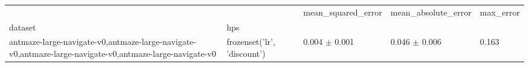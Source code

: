 \begin{tabular}{lllll}
\toprule
 &  & mean_squared_error & mean_absolute_error & max_error \\
dataset & hps &  &  &  \\
\midrule
antmaze-large-navigate-v0,antmaze-large-navigate-v0,antmaze-large-navigate-v0,antmaze-large-navigate-v0 & frozenset({'lr', 'discount'}) & 0.004 $\pm$ 0.001 & 0.046 $\pm$ 0.006 & 0.163 \\
\cline{1-5}
\bottomrule
\end{tabular}
